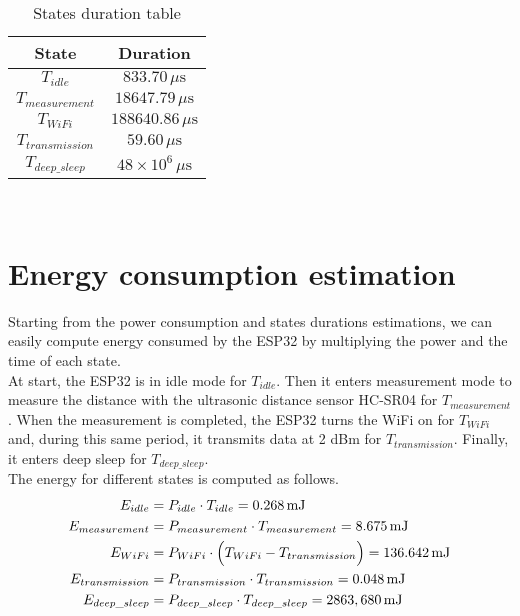 \begin{table}[H]
\centering 
\begin{tabular}{| c | c |}
	\hline 
	\rowcolor{bluepoli!40}
	\textbf{State} & \textbf{Duration}\T\B \\
	\hline 
	$T_{idle}$ & $833.70\,\mu\text{s}$ \T\B\\
	$T_{measurement}$ & $18647.79\,\mu\text{s}$ \T\B\\
	$T_{WiFi}$ & $188640.86\,\mu\text{s}$ \T\B\\
	$T_{transmission}$ & $59.60\,\mu\text{s}$ \T\B\\
	$T_{deep\_sleep}$  & $48\times10^6\,\mu\text{s}$ \T\B\\
	\hline
\end{tabular}
\\[10pt]
\caption{States duration table}
\label{table:states_duration_table}
\end{table}

\section{Energy consumption estimation}
Starting from the power consumption and states durations estimations, we can easily compute energy consumed by the ESP32 by multiplying the power and the time of each state.\\
At start, the ESP32 is in idle mode for $T_{idle}$. Then it enters measurement mode to measure the distance with the ultrasonic distance sensor HC-SR04 for $T_{measurement}$. When the measurement is completed, the ESP32 turns the WiFi on for $T_{WiFi}$ and, during this same period, it transmits data at 2 dBm for $T_{transmission}$. Finally, it enters deep sleep for $T_{deep\_sleep}$. \\

The energy for different states is computed as follows.
\begin{align*}
	E_{idle} &= P_{idle} \cdot T_{idle} = 0.268 \,\text{mJ} \\ 
	E_{measurement} &= P_{measurement} \cdot T_{measurement} = 8.675 \,\text{mJ} \\
	E_{WiFi} &= P_{WiFi} \cdot \Bigl(T_{WiFi} - T_{transmission} \Bigr) = 136.642\,\text{mJ} \\
	E_{transmission} &= P_{transmission} \cdot T_{transmission} = 0.048\,\text{mJ} \\
   	E_{deep\_sleep} &= P_{deep\_sleep} \cdot T_{deep\_sleep} = 2863,680\,\text{mJ} 
\end{align*}

